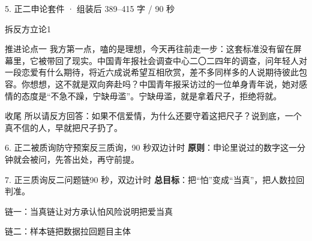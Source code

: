 \documentclass[script,pro]{debate}
\begin{document}
\begin{kit}{5. 正二申论}{套件 · 组装后 389–415 字 / 90 秒}
\begin{pick}{拆反方立论}{1}
\end{pick}
\begin{fixed}{推进论点一}
我方第一点，嗑的是理想，今天再往前走一步：这套标准没有留在屏幕里，它被带回了现实。中国青年报社会调查中心二〇二四年的调查，问年轻人对一段恋爱有什么期待，将近六成说希望互相欣赏，差不多同样多的人说期待彼此包容。你想想，这不就是双向奔赴吗？中国青年报采访过的一位单身青年说，她对感情的态度是“不急不躁，宁缺毋滥”。宁缺毋滥，就是拿着尺子，拒绝将就。
\end{fixed}
\begin{fixed}{收尾}
所以请反方回答：如果不信爱情，为什么还要守着这把尺子？说到底，一个真不信的人，早就把尺子扔了。
\end{fixed}
\end{kit}

\begin{stage}{6. 正二被质询防守预案}{反三质询，90 秒双边计时}
\textbf{原则}：申论里说过的数字这一分钟就会被问，先答出处，再守前提。
\begin{qa}
\end{qa}
\end{stage}

\begin{stage}{7. 正三质询反二问题链}{90 秒，双边计时}
\textbf{总目标}：把“怕”变成“当真”，把人数拉回判准。
\begin{chain}{链一：当真链}{让对方承认怕风险说明把爱当真}
\end{chain}
\begin{chain}{链二：样本链}{把数据拉回题目主体}
\end{chain}
\end{stage}
\end{document}
